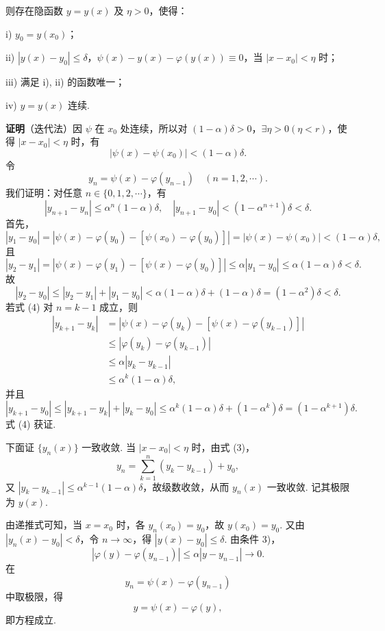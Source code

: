 \documentclass[UTF8, 12pt, fontset=fandol, oneside]{ctexart}
\begin{document}
\noindent 则存在隐函数 $y=y(x)$ 及 $\eta>0$，使得：

i) $y_0=y(x_0)$；

ii) $|y(x)-y_0|\le\delta$，$\psi(x)-y(x)-\varphi(y(x))\equiv0$，当 $|x-x_0|<\eta$ 时；

iii) 满足 i), ii) 的函数唯一；

iv) $y=y(x)$ 连续.

\noindent\textbf{证明}\quad （迭代法）因 $\psi$ 在 $x_0$ 处连续，所以对 $(1-\alpha)\delta>0$，$\exists\eta>0(\eta<r)$，使得 $|x-x_0|<\eta$ 时，有
\begin{equation}
  |\psi(x)-\psi(x_0)|<(1-\alpha)\delta.
\end{equation}
令
\begin{equation}
  y_n=\psi(x)-\varphi(y_{n-1})\quad(n=1,2,\cdots).
\end{equation}
我们证明：对任意 $n\in\{0,1,2,\cdots\}$，有
\begin{equation}
  |y_{n+1}-y_n|\le\alpha^n(1-\alpha)\delta,\quad
  |y_{n+1}-y_0|<(1-\alpha^{n+1})\delta<\delta.
\end{equation}
首先，
\[
  |y_1-y_0|
  =
  |\psi(x)-\varphi(y_0)-[\psi(x_0)-\varphi(y_0)]|
  =
  |\psi(x)-\psi(x_0)|
  <
  (1-\alpha)\delta,
\]
且
\[
  |y_2-y_1|
  =
  |\psi(x)-\varphi(y_1)-[\psi(x)-\varphi(y_0)]|
  \le
  \alpha|y_1-y_0|
  \le
  \alpha(1-\alpha)\delta<\delta.
\]
故
\[
  |y_2-y_0|\le |y_2-y_1|+|y_1-y_0|
  <
  \alpha(1-\alpha)\delta+(1-\alpha)\delta
  =
  (1-\alpha^2)\delta<\delta.
\]
若式 (4) 对 $n=k-1$ 成立，则
\[
\begin{aligned}
  |y_{k+1}-y_k|
  &=
  |\psi(x)-\varphi(y_k)-[\psi(x)-\varphi(y_{k-1})]| \\
  &\le |\varphi(y_k)-\varphi(y_{k-1})|              \\
  &\le \alpha|y_k-y_{k-1}|                          \\
  &\le \alpha^k(1-\alpha)\delta,
\end{aligned}
\]
并且
\[
  |y_{k+1}-y_0|
  \le |y_{k+1}-y_k|+|y_k-y_0|
  \le \alpha^k(1-\alpha)\delta+(1-\alpha^k)\delta
  =
  (1-\alpha^{k+1})\delta.
\]
式 (4) 获证.

下面证 $\{y_n(x)\}$ 一致收敛. 当 $|x-x_0|<\eta$ 时，由式 (3)，
\[
  y_n=\sum_{k=1}^n(y_k-y_{k-1})+y_0,
\]
又 $|y_k-y_{k-1}|\le\alpha^{k-1}(1-\alpha)\delta$，故级数收敛，从而 $y_n(x)$ 一致收敛. 记其极限为 $y(x)$.

由递推式可知，当 $x=x_0$ 时，各 $y_n(x_0)=y_0$，故 $y(x_0)=y_0$. 又由 $|y_n(x)-y_0|<\delta$，令 $n\to\infty$，得 $|y(x)-y_0|\le\delta$. 由条件 3)，
\[
  |\varphi(y)-\varphi(y_{n-1})|\le\alpha|y-y_{n-1}|\to0.
\]
在
\[
  y_n=\psi(x)-\varphi(y_{n-1})
\]
中取极限，得
\[
  y=\psi(x)-\varphi(y),
\]
即方程成立.
\end{document}

